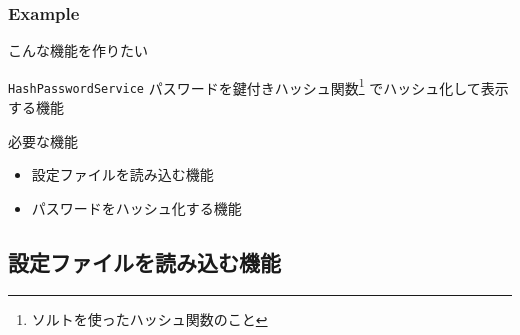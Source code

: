 \begin{frame}
  \frametitle{Example}

  こんな機能を作りたい

  \pause

  \begin{exampleblock}{\texttt{HashPasswordService}}
    パスワードを鍵付きハッシュ関数\footnote[frame]{ソルトを使ったハッシュ関数のこと}%
    でハッシュ化して表示する機能
  \end{exampleblock}

  \pause

  \begin{block}{必要な機能}
    \begin{itemize}
      \item<4-> 設定ファイルを読み込む機能
      \item<5-> パスワードをハッシュ化する機能
    \end{itemize}
  \end{block}

  \begin{center}
  \end{center}
\end{frame}

\subsection{設定ファイルを読み込む機能}

